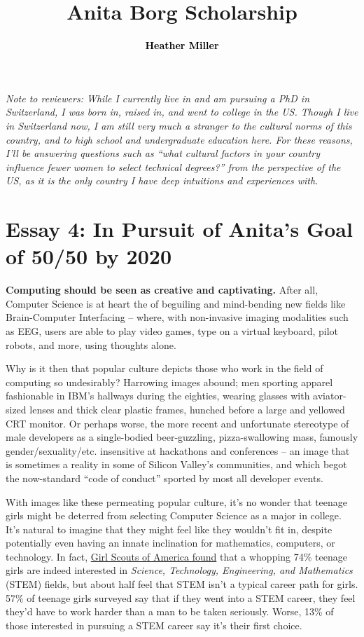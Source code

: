 \documentclass[acmtocl]{acmtrans2m}
\title{{\color{Black}Anita Borg Scholarship}}
\author{\textcolor{Black}{\textbf{Heather Miller}}}
\begin{document}
\setmonofont[Mapping=tex-text,Scale=0.9]{Inconsolata}
%
\maketitle

{\em Note to reviewers: While I currently live in and am pursuing a PhD in
Switzerland, I was born in, raised in, and went to college in the US. Though I
live in Switzerland now, I am still very much a stranger to the cultural norms
of this country, and to high school and undergraduate education here. For
these reasons, I'll be answering questions such as ``what cultural factors in
your country influence fewer women to select technical degrees?'' from the
perspective of the US, as it is the only country I have deep intuitions and
experiences with.}

\section*{\textbf{Essay 4:} In Pursuit of Anita's Goal of 50/50 by 2020}

\textbf{Computing should be seen as creative and captivating.}
After all, Computer Science is at heart the of beguiling and mind-bending new
fields like {Brain-Computer} Interfacing -- where, with non-invasive imaging
modalities such as EEG, users are able to play video games, type on a virtual
keyboard, pilot robots, and more, using thoughts alone.

Why is it then that popular culture depicts those who work in the field of
computing so undesirably? Harrowing images abound; men sporting apparel
fashionable in IBM's hallways during the eighties, wearing glasses with
aviator-sized lenses and thick clear plastic frames, hunched before a large
and yellowed CRT monitor. Or perhaps worse, the more recent and unfortunate
stereotype of male developers as a {single-bodied} {beer-guzzling},
{pizza-swallowing} mass, famously gender/sexuality/etc. insensitive at
hackathons and conferences -- an image that is sometimes a reality in
some of Silicon Valley's communities, and which begot the {now-standard} ``code
of conduct'' sported by most all developer events.

With images like these permeating popular culture, it's no wonder that teenage
girls might be deterred from selecting Computer Science as a major in college.
It's natural to imagine that they might feel like they wouldn't fit in,
despite potentially even having an innate inclination for mathematics,
computers, or technology. In fact,
\href{https://www.girlscouts.org/research/pdf/generation\_stem\_full\_report.pdf}{Girl Scouts of America found}
\cite{Girlscouts} that a whopping 74\% teenage girls are indeed interested in {\em
Science, Technology, Engineering, and Mathematics} (STEM) fields, but about
half feel that STEM isn't a typical career path for girls. 57\% of teenage
girls surveyed say that if they went into a STEM career, they feel they'd have
to work harder than a man to be taken seriously. Worse, 13\% of those
interested in pursuing a STEM career say it's their first choice.
\end{document}
